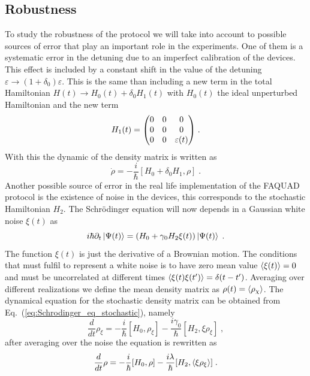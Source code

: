 \documentclass[a4paper,11pt]{article}
\begin{document}
\subsection{Robustness}
To study the robustness of the protocol we will take into account to possible sources of error that play an important role in the experiments. One of them is a systematic error in the detuning due to an imperfect calibration of the devices. This effect is included by a constant shift in the value of the detuning $\varepsilon\rightarrow (1+\delta_0)\varepsilon$. This is the same than including a new term in the total Hamiltonian $H(t)\rightarrow H_0(t) +\delta_0H_1(t)$ with $H_0(t)$ the ideal unperturbed Hamiltonian and the new term
\begin{equation}
	H_1(t)=\mqty(0 & 0 & 0 \\ 0 & 0 & 0 \\ 0 & 0 & \varepsilon(t))\; .
\end{equation}
With this the dynamic of the density matrix is written as
\begin{equation}
	\dot{\rho}=-\frac{i}{\hbar}[H_0+\delta _0H_1,\rho]\;.
	\label{eq:dinamycs_systematic_error}
\end{equation}
Another possible source of error in the real life implementation of the FAQUAD protocol is the existence of noise in the devices, this corresponds to the stochastic Hamiltonian $H_2$. The Schrödinger equation will now depends in a Gaussian white noise $\xi(t)$ as
\begin{equation}
	i\hbar\partial_t\ket{\Psi(t)}=(H_0+\gamma_0 H_2\xi(t))\ket{\Psi(t)}\; .
	\label{eq:Schrodinger_eq_stochastic}
\end{equation}
The function $\xi(t)$ is just the derivative of a Brownian motion. The conditions that must fulfil to represent a white noise is to have zero mean value $\expval{\xi(t)}=0$ and must be uncorrelated at different times $\expval{\xi(t)\xi(t')}=\delta(t-t')$. Averaging over different realizations we define the mean density matrix as $\rho(t)=\expval{\rho_\chi}$. The dynamical equation for the stochastic density matrix can be obtained from Eq.~(\ref{eq:Schrodinger_eq_stochastic}), namely
\begin{equation}
	\frac{d}{dt}\rho_\xi=-\frac{i}{\hbar}[H_0,\rho_\xi]-\frac{i\gamma_0}{\hbar}[H_2,\xi\rho_\xi]\; ,
	\label{eq:stochastic_density_matrix_eq}
\end{equation}
after averaging over the noise the equation is rewritten as
\begin{equation}
	\frac{d}{dt}\rho=-\frac{i}{\hbar}[H_0,\rho]-\frac{i\lambda}{\hbar}[H_2,\expval{\xi\rho_\xi}]\; .
	\label{eq:partial_result}
\end{equation}
\end{document}
